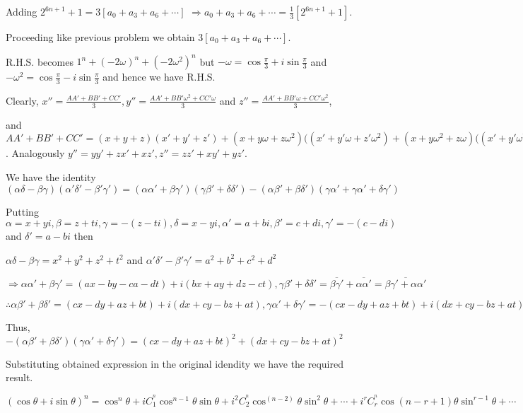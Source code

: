   Adding $2^{6n + 1} + 1 = 3[a_0 + a_3 + a_6 + \cdots]$
  $\Rightarrow a_0 + a_3 + a_6 + \cdots = \frac{1}{3}[2^{6n + 1} + 1]$.
\item Proceeding like previous problem we obtain $3[a_0 + a_3 + a_6 + \cdots]$.

  R.H.S. becomes $1^n + (-2\omega)^n + (-2\omega^2)^n$ but $-\omega = \cos\frac{\pi}{3} +
  i\sin\frac{\pi}{3}$ and $-\omega^2 = \cos\frac{\pi}{3} - i\sin\frac{\pi}{3}$ and hence we have R.H.S.
\item Clearly, $x'' = \frac{AA' + BB' + CC'}{3}, y'' = \frac{AA' + BB'\omega^2 + CC'\omega}{3}$ and $z'' =
  \frac{AA' + BB'\omega + CC'\omega^2}{3}$,

  and $AA' + BB' + CC' = (x + y + z)(x' + y' + z') + (x + y\omega + z\omega^2)((x' + y'\omega + z'\omega^2)
  + (x + y\omega^2 + z\omega)((x' + y'\omega^2 + z'\omega) = 3(xx' + zy' + yz')$. Analogously $y'' = yy' +
  zx' + xz', z'' = zz' + xy' + yz'$.
\item We have the identity $(\alpha\delta - \beta\gamma)(\alpha'\delta' - \beta'\gamma') = (\alpha\alpha' +
  \beta\gamma')(\gamma\beta' + \delta\delta') - (\alpha\beta' + \beta\delta')(\gamma\alpha' + \gamma\alpha'
  + \delta\gamma')$

  Putting $\alpha = x + yi, \beta = z + ti, \gamma = -(z - ti), \delta = x - yi, \alpha' = a + bi, \beta' =
  c + di, \gamma' = -(c - di)$ and $\delta' = a - bi$ then

  $\alpha\delta - \beta\gamma = x^2 + y^2 + z^2 + t^2$ and $\alpha'\delta' - \beta'\gamma' = a^2 + b^2 + c^2
  + d^2$

  $\Rightarrow \alpha\alpha' + \beta\gamma' = (ax - by - ca - dt) + i(bx + ay + dz - ct), \gamma\beta' +
  \delta\delta' = \overline{\beta\gamma'} + \overline{\alpha\alpha'} = \overline{\beta\gamma' +
    \alpha\alpha'}$

  $\therefore \alpha\beta' + \beta\delta' = (cx - dy + az + bt) + i(dx + cy - bz + at), \gamma\alpha' +
  \delta\gamma' = -(cx - dy + az + bt) + i(dx + cy - bz + at)$

  Thus, $-(\alpha\beta' + \beta\delta')(\gamma\alpha' + \delta\gamma') = (cx - dy + az + bt)^2 + (dx + cy -
  bz + at)^2$

  Substituting obtained expression in the original idendity we have the required result.
\item $(\cos\theta + i\sin\theta)^n = \cos^n\theta + iC_1^^n\cos^{n - 1}\theta\sin\theta +
  i^2C_2^^n\cos^{(n - 2)}\theta\sin^2\theta + \cdots + i^rC_r^^n\cos{(n - r + 1)}\theta\sin^{r - 1}\theta +
  \cdots$

